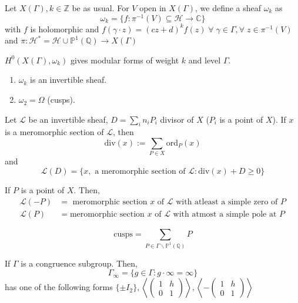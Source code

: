 \documentclass[oneside, 12pt]{scrbook}
\newcommand{\CC}{\mathbb C}
\newcommand{\QQ}{\mathbb Q}
\newcommand{\ZZ}{\mathbb Z}
\newcommand{\PP}{\mathbb{P}}
\newcommand{\ord}{\mathrm{ord}}
\newcommand{\bs}{\backslash}
\newcommand{\Hh}{\mathcal{H}}
\theoremstyle{theorem}
\begin{document}
\begin{lemma}

\end{lemma}

\begin{definition}
Let $X(\Gamma), k \in \ZZ$ be as usual. For $V$ open in $X(\Gamma)$, we define a sheaf $\omega_{k}$ as $$\omega_{k} = \{f: \pi^{-1}(V) \subseteq \Hh \rightarrow \CC\}$$ with $f$ is holomorphic and $f(\gamma \cdot z) = (cz+d)^k f(z) \; \forall \; \gamma \in \Gamma, \forall \; z \in \pi^{-1}(V)$ and $\pi: \Hh^{*} = \Hh \cup \PP^{1}(\QQ) \rightarrow X(\Gamma)$ 
\end{definition}

\begin{remark}
$H^{0}(X(\Gamma), \omega_{k})$ gives modular forms of weight $k$ and level $\Gamma$. 
\end{remark}

\begin{theorem}
\begin{enumerate}
\item $\omega_{k}$ is an invertible sheaf.
\item $\omega_{2} = \Omega$ (cusps).
\end{enumerate}
\end{theorem}

Let $\mathcal{L}$ be an invertible sheaf, $D =\sum_{i} n_{i}P_{i}$ divisor of $X$ ($P_{i}$ is a point of $X$). If $x$ is a meromorphic section of $\mathcal{L}$, then $$\mathrm{div}(x) := \sum_{P \in X} \ord_{P}(x)$$ and $$\mathcal{L}(D) = \{x, \text{ a meromorphic section of }\mathcal{L}: \mathrm{div}(x) + D \geq 0\}$$

\begin{example}
If $P$ is a point of $X$. Then, 
\begin{align*}
\mathcal{L}(-P) &= \text{ meromorphic section $x$ of $\mathcal{L}$ with atleast a simple zero of $P$}\\
\mathcal{L}(P) &= \text{meromorphic section $x$ of $\mathcal{L}$ with atmost a simple pole at $P$}
\end{align*}
\end{example}

\begin{definition}
$$\text{cusps} =\sum_{P \in \Gamma \bs \PP^1(\QQ)} P$$
\end{definition}

If $\Gamma$ is a congruence subgroup. Then, $$\Gamma_{\infty} =\{g \in \Gamma: g \cdot \infty = \infty\}$$ has one of the following forms $\{\pm I_{2}\}, \left\langle \begin{pmatrix}
1 & h \\ 0 & 1 
\end{pmatrix} \right\rangle, \left\langle -\begin{pmatrix}
1 & h \\ 0 & 1 
\end{pmatrix} \right\rangle$
\end{document}
